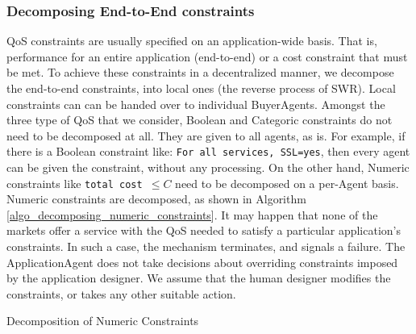 \documentclass[10pt,journal,compsoc]{IEEEtran}
\begin{document}
\subsubsection{Decomposing End-to-End constraints\label{decomposing_constraints}} QoS constraints are usually specified on an application-wide basis. That is, performance for an entire application (end-to-end) or a cost constraint that must be met. To achieve these constraints in a decentralized manner, we decompose the end-to-end constraints, into local ones (the reverse process of SWR). Local constraints can can be handed over to individual BuyerAgents. Amongst the three type of QoS that we consider, Boolean and Categoric constraints do not need to be decomposed at all. They are given to all agents, as is. For example, if there is a Boolean constraint like: \texttt{For all services, SSL=yes}, then every agent can be given the constraint, without any processing. On the other hand, Numeric constraints like \texttt{total cost $\leq C$} need to be decomposed on a per-Agent basis. Numeric constraints are decomposed, as shown in Algorithm \ref{algo_decomposing_numeric_constraints}. It may happen that none of the markets offer a service with the QoS needed to satisfy a particular application's constraints. In such a case, the mechanism terminates, and signals a failure. The ApplicationAgent does not take decisions about overriding constraints imposed by the application designer. We assume that the human designer modifies the constraints, or takes any other suitable action. 

\begin{algorithm}
 \DontPrintSemicolon
 \caption{Decomposition of Numeric Constraints \label{algo_decomposing_numeric_constraints}}
\end{algorithm}
\end{document}
